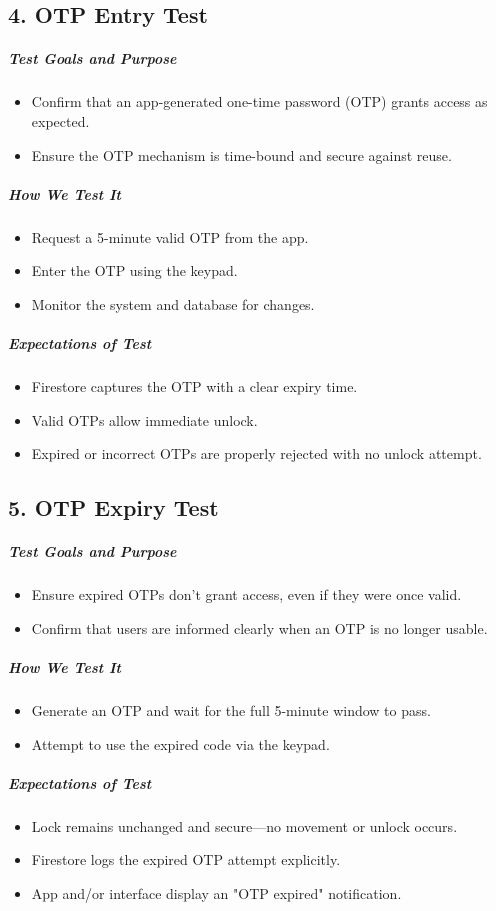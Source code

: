 \subsection*{4. OTP Entry Test}
\subparagraph{Test Goals and Purpose}
\begin{itemize}
    \item Confirm that an app-generated one-time password (OTP) grants access as expected.
    \item Ensure the OTP mechanism is time-bound and secure against reuse.
\end{itemize}
\subparagraph{How We Test It}
\begin{itemize}
    \item Request a 5-minute valid OTP from the app.
    \item Enter the OTP using the keypad.
    \item Monitor the system and database for changes.
\end{itemize}
\subparagraph{Expectations of Test}
\begin{itemize}
    \item Firestore captures the OTP with a clear expiry time.
    \item Valid OTPs allow immediate unlock.
    \item Expired or incorrect OTPs are properly rejected with no unlock attempt.
\end{itemize}

\subsection*{5. OTP Expiry Test}
\subparagraph{Test Goals and Purpose}
\begin{itemize}
    \item Ensure expired OTPs don’t grant access, even if they were once valid.
    \item Confirm that users are informed clearly when an OTP is no longer usable.
\end{itemize}
\subparagraph{How We Test It}
\begin{itemize}
    \item Generate an OTP and wait for the full 5-minute window to pass.
    \item Attempt to use the expired code via the keypad.
\end{itemize}
\subparagraph{Expectations of Test}
\begin{itemize}
    \item Lock remains unchanged and secure—no movement or unlock occurs.
    \item Firestore logs the expired OTP attempt explicitly.
    \item App and/or interface display an "OTP expired" notification.
\end{itemize}

